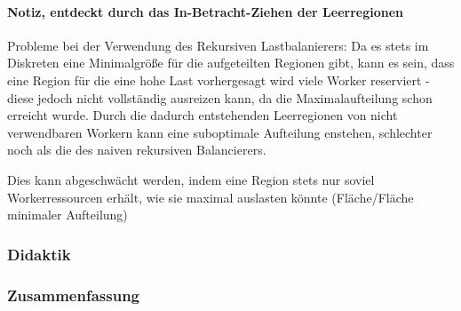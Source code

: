 

\paragraph{Notiz, entdeckt durch das In-Betracht-Ziehen der Leerregionen}

Probleme bei der Verwendung des Rekursiven Lastbalanierers:
Da es stets im Diskreten eine Minimalgröße für die aufgeteilten Regionen gibt,
kann es sein, dass eine Region für die eine hohe Last vorhergesagt wird viele Worker reserviert -
diese jedoch nicht vollständig ausreizen kann, da die Maximalaufteilung schon erreicht wurde.
Durch die dadurch entstehenden Leerregionen von nicht verwendbaren Workern
kann eine suboptimale Aufteilung enstehen, schlechter noch als die des naiven rekursiven Balancierers.

Dies kann abgeschwächt werden, indem eine Region stets nur soviel Workerressourcen erhält,
wie sie maximal auslasten könnte (Fläche/Fläche minimaler Aufteilung)


\subsubsection{Didaktik}

\subsubsection{Zusammenfassung}
